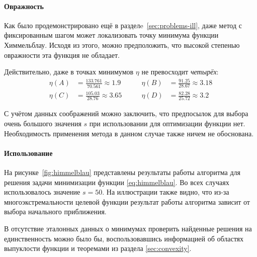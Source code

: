 \paragraph{Овражность}
Как было продемонстрировано ещё в разделe \ref{sec:problems-ill}, даже
метод \gd{} с фиксированным шагом может локализовать точку минимума
функции Химмельблау. Исходя из этого, можно предположить, что высокой
степенью овражности эта функция не обладает.

Действительно, даже в точках минимумов $\eta$ не превосходит
\emph{четырёх}:
\begin{equation}
  \begin{aligned}
    \eta(A) &= \frac{133.761}{70.561} \approx 1.9&\qquad
    \eta(B) &= \frac{91.25}{28.67} \approx 3.18\\ 
    \eta(C) &= \frac{105.03}{28.76} \approx 3.65&\qquad
    \eta(D) &= \frac{82.28}{25.72} \approx 3.2
\end{aligned}
\end{equation}

С учётом данных соображений можно заключить, что предпосылок для
выбора очень большого значения $s$ при использовании \relch{} для
оптимизации функции нет. Необходимость применения метода \gdrelch{} в
данном случае также ничем не обоснована.

\paragraph{Использование \relch{}}

На рисунке \ref{fig:himmelblau} представлены результаты работы
алгоритма \relch{} для решения задачи минимизации функции
\eqref{eq:himmelblau}. Во всех случаях использовалось значение $s=50$.
На иллюстрации также видно, что из-за многоэкстремальности целевой
функции результат работы алгоритма зависит от выбора начального
приближения.

В отсутствие эталонных данных о минимумах проверить найденные решения
на единственность можно было бы, воспользовавшись информацией об
областях выпуклости функции и теоремами из раздела
\ref{sec:convexity}.

